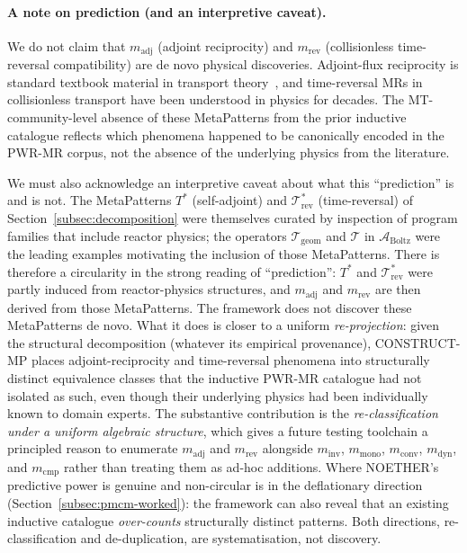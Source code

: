\documentclass[acmsmall,screen,review]{acmart}
\begin{document}
\paragraph{A note on prediction (and an interpretive caveat).} We do not claim that $m_{\mathrm{adj}}$ (adjoint reciprocity) and $m_{\mathrm{rev}}$ (collisionless time-reversal compatibility) are de novo physical discoveries. Adjoint-flux reciprocity is standard textbook material in transport theory~\cite{BellGlasstone1970, LewisMiller1993}, and time-reversal MRs in collisionless transport have been understood in physics for decades. The MT-community-level absence of these MetaPatterns from the prior inductive catalogue reflects which phenomena happened to be canonically encoded in the PWR-MR corpus, not the absence of the underlying physics from the literature.

We must also acknowledge an interpretive caveat about what this ``prediction'' is and is not. The MetaPatterns $T^{*}$ (self-adjoint) and $\mathcal{T}^{*}_{\mathrm{rev}}$ (time-reversal) of Section~\ref{subsec:decomposition} were themselves curated by inspection of program families that include reactor physics; the operators $\mathcal{T}_{\mathrm{geom}}$ and $\mathcal{T}$ in $\mathcal{A}_{\mathrm{Boltz}}$ were the leading examples motivating the inclusion of those MetaPatterns. There is therefore a circularity in the strong reading of ``prediction'': $T^{*}$ and $\mathcal{T}^{*}_{\mathrm{rev}}$ were partly induced from reactor-physics structures, and $m_{\mathrm{adj}}$ and $m_{\mathrm{rev}}$ are then derived from those MetaPatterns. The framework does not discover these MetaPatterns de novo. What it does is closer to a uniform \emph{re-projection}: given the structural decomposition (whatever its empirical provenance), CONSTRUCT-MP places adjoint-reciprocity and time-reversal phenomena into structurally distinct equivalence classes that the inductive PWR-MR catalogue had not isolated as such, even though their underlying physics had been individually known to domain experts. The substantive contribution is the \emph{re-classification under a uniform algebraic structure}, which gives a future testing toolchain a principled reason to enumerate $m_{\mathrm{adj}}$ and $m_{\mathrm{rev}}$ alongside $m_{\mathrm{inv}}$, $m_{\mathrm{mono}}$, $m_{\mathrm{conv}}$, $m_{\mathrm{dyn}}$, and $m_{\mathrm{cmp}}$ rather than treating them as ad-hoc additions. Where NOETHER's predictive power is genuine and non-circular is in the deflationary direction (Section~\ref{subsec:pmcm-worked}): the framework can also reveal that an existing inductive catalogue \emph{over-counts} structurally distinct patterns. Both directions, re-classification and de-duplication, are systematisation, not discovery.
\end{document}
